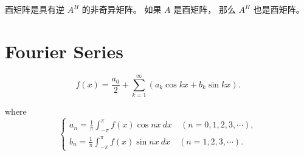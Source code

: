 酉矩阵是具有逆 $ A^{H} $ 的非奇异矩阵。 如果 $ A $ 是酉矩阵， 那么 $ A^{H} $ 也是酉矩阵。

\section{Fourier Series}

\begin{definition}[傅里叶级数]
    \begin{equation}
f(x)=\frac{a_{0}}{2}+\sum_{k=1}^{\infty}\left(a_{k} \cos k x+b_{k} \sin k x\right) .
\end{equation}

where \begin{equation} \left\{\begin{array}{l}a_{n}=\frac{1}{\pi} \int_{-\pi}^{\pi} f(x) \cos n x {~d} x \quad(n=0,1,2,3, \cdots), \\ b_{n}=\frac{1}{\pi} \int_{-\pi}^{\pi} f(x) \sin n x {~d} x \quad(n=1,2,3, \cdots) .\end{array}\right. \end{equation}
\end{definition}

